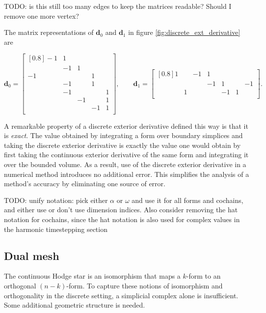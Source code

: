 \documentclass[utf8,english]{gradu3}
\begin{document}
TODO: is this still too many edges to keep the matrices readable?
Should I remove one more vertex?

The matrix representations of $\mathbf{d}_0$ and $\mathbf{d}_1$
in figure \ref{fig:discrete_ext_derivative} are

\[
  \mathbf{d}_0 = \begin{bmatrix}[0.8]
    -1 & 1 \\
       & -1 & 1 \\
    -1 & & & 1 \\
       & -1 & & 1 \\
       & -1 & & & 1 \\
       & & -1 & & 1 \\
       & & & -1 & 1 \\
  \end{bmatrix},
  \qquad
  \mathbf{d}_1 = \begin{bmatrix}[0.8]
    1 & & -1 & 1 \\
      & & & -1 & 1 & & -1 \\
      & 1 & & & -1 & 1 \\
  \end{bmatrix}.
\]

A remarkable property of a discrete exterior derivative
defined this way is that it is \textit{exact}.
The value obtained by integrating a form over boundary simplices
and taking the discrete exterior derivative
is exactly the value one would obtain
by first taking the continuous exterior derivative of the same form
and integrating it over the bounded volume.
As a result, use of the discrete exterior derivative in a numerical method
introduces no additional error.
This simplifies the analysis of a method's accuracy
by eliminating one source of error.

TODO: unify notation: pick either $\alpha$ or $\omega$
and use it for all forms and cochains,
and either use or don't use dimension indices.
Also consider removing the hat notation for cochains,
since the hat notation is also used for complex values
in the harmonic timestepping section


\subsection{Dual mesh}\label{sec:dual_mesh}

The continuous Hodge star is an isomorphism
that maps a $k$-form to an orthogonal $(n-k)$-form.
To capture these notions of isomorphism and orthogonality
in the discrete setting, a simplicial complex alone is insufficient.
Some additional geometric structure is needed.
\end{document}
